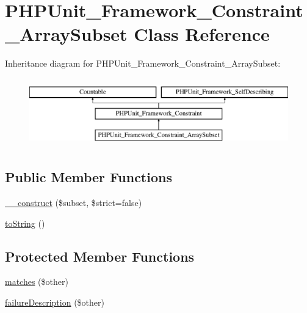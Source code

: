 \hypertarget{class_p_h_p_unit___framework___constraint___array_subset}{}\section{P\+H\+P\+Unit\+\_\+\+Framework\+\_\+\+Constraint\+\_\+\+Array\+Subset Class Reference}
\label{class_p_h_p_unit___framework___constraint___array_subset}
Inheritance diagram for P\+H\+P\+Unit\+\_\+\+Framework\+\_\+\+Constraint\+\_\+\+Array\+Subset\+:\begin{figure}[H]
\begin{center}
\leavevmode
\includegraphics[height=3.000000cm]{class_p_h_p_unit___framework___constraint___array_subset}
\end{center}
\end{figure}
\subsection*{Public Member Functions}
\begin{DoxyCompactItemize}
\item 
\mbox{\hyperlink{class_p_h_p_unit___framework___constraint___array_subset_a91025fcc7113d01bb4918fc6dc30ced3}{\+\_\+\+\_\+construct}} (\$subset, \$strict=false)
\item 
\mbox{\hyperlink{class_p_h_p_unit___framework___constraint___array_subset_a5558c5d549f41597377fa1ea8a1cefa3}{to\+String}} ()
\end{DoxyCompactItemize}
\subsection*{Protected Member Functions}
\begin{DoxyCompactItemize}
\item 
\mbox{\hyperlink{class_p_h_p_unit___framework___constraint___array_subset_a9c9c337de483bbdbb9fa249a6c7c9cc5}{matches}} (\$other)
\item 
\mbox{\hyperlink{class_p_h_p_unit___framework___constraint___array_subset_aaabb679273bfb812df4d81c283754a59}{failure\+Description}} (\$other)
\end{DoxyCompactItemize}
